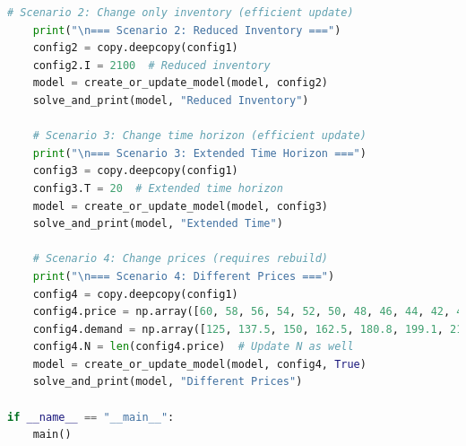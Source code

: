 \documentclass[12pt]{article}
\begin{document}
\begin{lstlisting}[language=Python, caption={Markdown Management Python Code}]
    # Scenario 2: Change only inventory (efficient update)
    print("\n=== Scenario 2: Reduced Inventory ===")
    config2 = copy.deepcopy(config1)
    config2.I = 2100  # Reduced inventory
    model = create_or_update_model(model, config2)
    solve_and_print(model, "Reduced Inventory")
    
    # Scenario 3: Change time horizon (efficient update)
    print("\n=== Scenario 3: Extended Time Horizon ===")
    config3 = copy.deepcopy(config1)
    config3.T = 20  # Extended time horizon
    model = create_or_update_model(model, config3)
    solve_and_print(model, "Extended Time")
    
    # Scenario 4: Change prices (requires rebuild)
    print("\n=== Scenario 4: Different Prices ===")
    config4 = copy.deepcopy(config1)
    config4.price = np.array([60, 58, 56, 54, 52, 50, 48, 46, 44, 42, 40, 38, 36]) 
    config4.demand = np.array([125, 137.5, 150, 162.5, 180.8, 199.1, 217.5, 239.4, 261.3, 283.2, 305.1, 327, 348.8])
    config4.N = len(config4.price)  # Update N as well
    model = create_or_update_model(model, config4, True)
    solve_and_print(model, "Different Prices")

if __name__ == "__main__":
    main()
\end{lstlisting}
\end{document}

